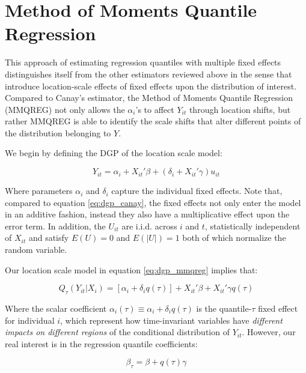 \documentclass{article}
\begin{document}
\section{Method of Moments Quantile Regression}\label{sec:mmqreg}

This approach of estimating regression quantiles with multiple fixed effects distinguishes itself from the other estimators reviewed above in the sense that \cite{mss2019} introduce location-scale effects of fixed effects upon the distribution of interest. Compared to Canay's estimator, the Method of Moments Quantile Regression (MMQREG) not only allows the $\alpha_i$'s to affect $Y_{it}$ through location shifts, but rather MMQREG is able to identify the scale shifts that alter different points of the distribution belonging to $Y$.

We begin by defining the DGP of the location scale model:

\begin{equation}\label{eq:dgp_mmqreg}
    Y_{it} = \alpha_i + X_{it}' \beta + (\delta_i + X_{it}' \gamma) u_{it}
\end{equation}

Where parameters $\alpha_i$ and $\delta_i$ capture the individual fixed effects. Note that, compared to equation \ref{eq:dgp_canay}, the fixed effects not only enter the model in an additive fashion, instead they also have a multiplicative effect upon the error term. In addition, the $U_{it}$ are i.i.d. across $i$ and $t$, statistically independent of $X_{it}$ and satisfy $E(U) = 0$ and $E(|U|) = 1$ both of which normalize the random variable.

Our location scale model in equation \ref{eq:dgp_mmqreg} implies that:

\begin{equation}\label{eq:mmqreg_quantile}
    Q_{\tau}(Y_{it}|X_i) = [\alpha_i + \delta_i q(\tau)] + X_{it}' \beta + X_{it}' \gamma q(\tau)
\end{equation}

Where the scalar coefficient $\alpha_i(\tau) \equiv \alpha_i + \delta_i q(\tau)$ is the quantile-$\tau$ fixed effect for individual $i$, which represent how time-invariant variables have \textit{different impacts on different regions} of the conditional distribution of $Y_{it}$. However, our real interest is in the regression quantile coefficients:

\begin{equation}\label{eq:rqcoefficients_mmqreg}
    \beta_{\tau} = \beta + q(\tau) \gamma
\end{equation}
\end{document}
